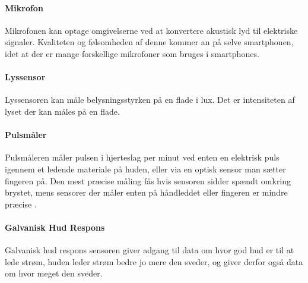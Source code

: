 \paragraph{Mikrofon}
Mikrofonen kan optage omgivelserne ved at konvertere akustisk lyd til elektriske signaler. Kvaliteten og følsomheden af denne kommer an på selve smartphonen, idet at der er mange forskellige mikrofoner som bruges i smartphones. 

\paragraph{Lyssensor}
Lyssensoren kan måle belysningsstyrken på en flade i lux. Det er intensiteten af lyset der kan måles på en flade.

\paragraph{Pulsmåler}
Pulsmåleren måler pulsen i hjerteslag per minut ved enten en elektrisk puls igennem et ledende materiale på huden, eller via en optisk sensor man sætter fingeren på.
Den mest præcise måling fås hvis sensoren sidder spændt omkring brystet, mens sensorer der måler enten på håndleddet eller fingeren er mindre præcise \cite{burke1998precision}.

\paragraph{Galvanisk Hud Respons}
Galvanisk hud respons sensoren giver adgang til data om hvor god hud er til at lede strøm, huden leder strøm bedre jo mere den sveder, og giver derfor også data om hvor meget den sveder.